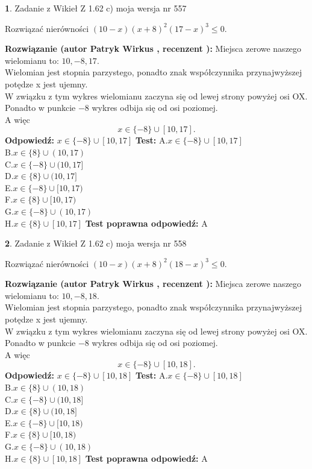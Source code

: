 \documentclass[12pt, a4paper]{article}
\theoremstyle{definition} %
\newtheorem{zad}{}
\newcommand{\zadStart}[1]{\begin{zad}#1\newline}
\newcommand{\zadStop}{\end{zad}}
\newcommand{\rozwStart}[2]{\noindent \textbf{Rozwiązanie (autor #1 , recenzent #2): }\newline}
\newcommand{\rozwStop}{\newline}
\newcommand{\odpStart}{\noindent \textbf{Odpowiedź:}\newline}
\newcommand{\odpStop}{\newline}
\newcommand{\testStart}{\noindent \textbf{Test:}\newline}
\newcommand{\testStop}{\newline}
\newcommand{\kluczStart}{\noindent \textbf{Test poprawna odpowiedź:}\newline}
\newcommand{\kluczStop}{\newline}
\begin{document}
\zadStart{Zadanie z Wikieł Z 1.62 c) moja wersja nr 557}

Rozwiązać nierówności $(10-x)(x+8)^{2}(17-x)^{3}\le0$.
\zadStop
\rozwStart{Patryk Wirkus}{}
Miejsca zerowe naszego wielomianu to: $10, -8, 17$.\\
Wielomian jest stopnia parzystego, ponadto znak współczynnika przy\linebreak najwyższej potędze x jest ujemny.\\ W związku z tym wykres wielomianu zaczyna się od lewej strony powyżej osi OX.\\
Ponadto w punkcie $-8$ wykres odbija się od osi poziomej.\\
A więc $$x \in \{-8\} \cup [10,17].$$
\rozwStop
\odpStart
$x \in \{-8\} \cup [10,17]$
\odpStop
\testStart
A.$x \in \{-8\} \cup [10,17]$\\
B.$x \in \{8\} \cup (10,17)$\\
C.$x \in \{-8\} \cup (10,17]$\\
D.$x \in \{8\} \cup (10,17]$\\
E.$x \in \{-8\} \cup [10,17)$\\
F.$x \in \{8\} \cup [10,17)$\\
G.$x \in \{-8\} \cup (10,17)$\\
H.$x \in \{8\} \cup [10,17]$
\testStop
\kluczStart
A
\kluczStop



\zadStart{Zadanie z Wikieł Z 1.62 c) moja wersja nr 558}

Rozwiązać nierówności $(10-x)(x+8)^{2}(18-x)^{3}\le0$.
\zadStop
\rozwStart{Patryk Wirkus}{}
Miejsca zerowe naszego wielomianu to: $10, -8, 18$.\\
Wielomian jest stopnia parzystego, ponadto znak współczynnika przy\linebreak najwyższej potędze x jest ujemny.\\ W związku z tym wykres wielomianu zaczyna się od lewej strony powyżej osi OX.\\
Ponadto w punkcie $-8$ wykres odbija się od osi poziomej.\\
A więc $$x \in \{-8\} \cup [10,18].$$
\rozwStop
\odpStart
$x \in \{-8\} \cup [10,18]$
\odpStop
\testStart
A.$x \in \{-8\} \cup [10,18]$\\
B.$x \in \{8\} \cup (10,18)$\\
C.$x \in \{-8\} \cup (10,18]$\\
D.$x \in \{8\} \cup (10,18]$\\
E.$x \in \{-8\} \cup [10,18)$\\
F.$x \in \{8\} \cup [10,18)$\\
G.$x \in \{-8\} \cup (10,18)$\\
H.$x \in \{8\} \cup [10,18]$
\testStop
\kluczStart
A
\kluczStop
\end{document}
